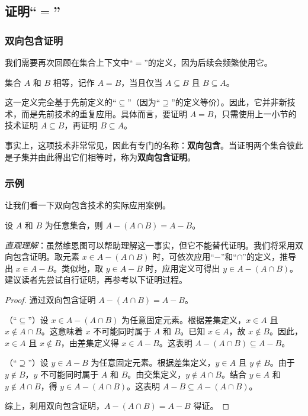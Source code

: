 \subsection{证明``$=$''}

\subsubsection*{双向包含证明}

我们需要再次回顾在集合上下文中``$=$''的定义，因为后续会频繁使用它。

\begin{definition}
    集合 $A$ 和 $B$ 相等，记作 $A = B$，当且仅当 $A \subseteq B$ 且 $B \subseteq A$。
\end{definition}

这一定义完全基于先前定义的``$\subseteq$''（因为``$\supseteq$''的定义等价）。因此，它并非新技术，而是先前技术的重复应用。具体而言，要证明 $A = B$，只需使用上一小节的技术证明 $A \subseteq B$，再证明 $B \subseteq A$。

事实上，这项技术非常常见，因此有专门的名称：\textbf{双向包含}。当证明两个集合彼此是子集并由此得出它们相等时，称为\textbf{双向包含证明}。

\subsubsection*{示例}

让我们看一下双向包含技术的实际应用案例。

\begin{lemma}
    设 $A$ 和 $B$ 为任意集合，则 $A - (A \cap B) = A - B$。
\end{lemma}

\emph{直观理解}：虽然维恩图可以帮助理解这一事实，但它不能替代证明。我们将采用双向包含证明。取元素 $x \in A - (A \cap B)$ 时，可依次应用``$-$''和``$\cap$''的定义，推导出 $x \in A - B$。类似地，取 $y \in A - B$ 时，应用定义可得出 $y \in A - (A \cap B)$。建议读者先尝试自行证明，再参考以下证明过程。

\begin{proof}
    通过双向包含证明 $A - (A \cap B) = A - B$。

    （``$\subseteq$''）设 $x \in A - (A \cap B)$ 为任意固定元素。根据差集定义，$x \in A$ 且 $x \notin A \cap B$。这意味着 $x$ 不可能同时属于 $A$ 和 $B$。已知 $x \in A$，故 $x \notin B$。因此，$x \in A$ 且 $x \notin B$，由差集定义得 $x \in A-B$。这表明 $A - (A \cap B) \subseteq A - B$。

    （``$\supseteq$''）设 $y \in A - B$ 为任意固定元素。根据差集定义，$y \in A$ 且 $y \notin B$。由于 $y \notin B$，$y$ 不可能同时属于 $A$ 和 $B$。由交集定义，$y \notin A \cap B$。结合 $y \in A$ 和 $y \notin A \cap B$，得 $y \in A - (A \cap B)$。这表明 $A - B \subseteq A - (A \cap B)$。

    综上，利用双向包含证明，$A - (A \cap B) = A - B$ 得证。
\end{proof}

